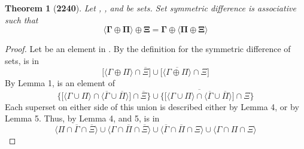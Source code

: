 \documentclass[preview]{standalone}
\newtheorem{theorem}{Theorem}
\begin{document}
\begin{theorem}[\textbf{2240}]
    Let \bm{$\Gamma$}, \bm{$\Pi$}, and \bm{$\Xi$} be sets. 
    Set symmetric difference is associative such that 
    \begin{equation*}
        \bm{
            \Big \langle \Gamma \oplus \Pi \Big \rangle
                \oplus 
            \Xi 
                = 
            \Gamma 
                \oplus 
            \Big \langle \Pi \oplus \Xi \Big \rangle
        }
    \end{equation*}
\end{theorem}
\begin{proof}
    Let \bm{$\zeta$} be an element in 
    \bm{$
        \big \langle \Gamma \oplus \Pi \big \rangle
            \oplus 
        \Xi 
    $}. 
    By the definition for the symmetric 
    difference of sets, \bm{$\zeta$} is in
    \begin{equation*}
        \bigg[
            \Big \langle \Gamma \oplus \Pi \Big \rangle
                \cap
            \overline{\Xi}
        \bigg]
            \cup
        \bigg[
            \Big \langle \overline{
                \Gamma \oplus \Pi
            } \Big \rangle 
                \cap
            \Xi
        \bigg]
    \end{equation*}
    By Lemma 1, \bm{$\zeta$} is an element of
    \begin{equation*}
        \Bigg\{
            \bigg[
                \Big \langle \Gamma \cup \Pi \Big \rangle
                    \cap
                \Big \langle \overline{\Gamma} \cup \overline{\Pi} \Big \rangle
            \bigg]
                \cap
            \overline{\Xi}
        \Bigg\}
            \cup
        \Bigg\{
            \bigg[ \overline{
                \Big \langle \Gamma \cup \Pi \Big \rangle
                \cap
            \Big \langle \overline{\Gamma} \cup \overline{\Pi} \Big \rangle
            } \bigg]
                \cap
            \Xi
        \Bigg\}
    \end{equation*}
    Each superset on either side of this union is described either by Lemma 4,
    or by Lemma 5. Thus, by Lemma 4, and 5, \bm{$\zeta$} is in
    \begin{equation*}
        \Big \langle \Pi \cap \overline{\Gamma} \cap \overline{\Xi} \Big \rangle
            \cup
        \Big \langle \Gamma \cap \overline{\Pi} \cap \overline{\Xi} \Big \rangle
            \cup
        \Big \langle \overline{\Gamma} \cap \overline{\Pi} \cap \Xi \Big \rangle
            \cup
        \Big \langle \Gamma \cap \Pi \cap \Xi \Big \rangle

\end{equation*}
\end{proof}
\end{document}
